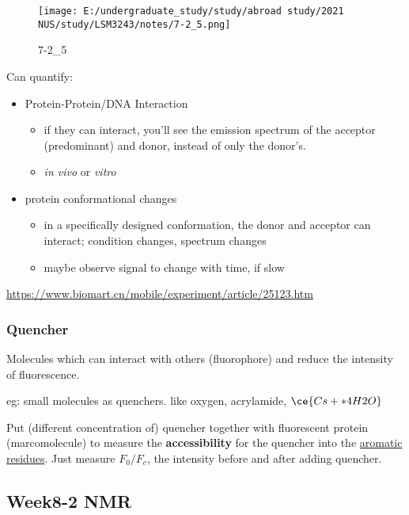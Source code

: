 \documentclass[]{article}
\begin{document}
\begin{figure}
\centering
\texttt{[image: E:/undergraduate\_study/study/abroad study/2021 NUS/study/LSM3243/notes/7-2\_5.png]}
\caption{7-2\_5}
\end{figure}

Can quantify:

\begin{itemize}
\item
  Protein-Protein/DNA Interaction

  \begin{itemize}
  \item
    if they can interact, you'll see the emission spectrum of the
    acceptor (predominant) and donor, instead of only the donor's.
  \item
    \emph{in vivo} or \emph{vitro}
  \end{itemize}
\item
  protein conformational changes

  \begin{itemize}
  \item
    in a specifically designed conformation, the donor and acceptor can
    interact; condition changes, spectrum changes
  \item
    maybe observe signal to change with time, if slow
  \end{itemize}
\end{itemize}

\url{https://www.biomart.cn/mobile/experiment/article/25123.htm}

\hypertarget{quencher}{%
\subsubsection{Quencher}\label{quencher}}

Molecules which can interact with others (fluorophore) and reduce the
intensity of fluorescence.

eg: small molecules as quenchers. like oxygen, acrylamide,
\(\ce{Cs+*4H2O}\)

Put (different concentration of) quencher together with fluorescent
protein (marcomolecule) to measure the \textbf{accessibility} for the
quencher into the \underline{aromatic residues}. Just measure
\(F_0/F_c\), the intensity before and after adding quencher.

\hypertarget{week8-2-nmr}{%
\subsection{Week8-2 NMR}\label{week8-2-nmr}}
\end{document}
